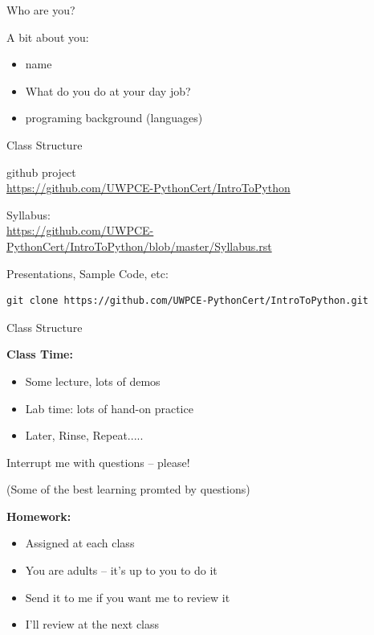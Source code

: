 \documentclass{beamer}
\begin{document}
\begin{frame}{Who are you?}

{\Large A bit about you:}
\begin{itemize}
  \item name
  \item What do you do at your day job?
  \item programing background (languages)
\end{itemize}

\end{frame}


\begin{frame}[fragile]{Class Structure}

{\LARGE github project} \\
\url{https://github.com/UWPCE-PythonCert/IntroToPython}

\vspace{0.2in}
{\large Syllabus:} \\
\url{https://github.com/UWPCE-PythonCert/IntroToPython/blob/master/Syllabus.rst} 

\vspace{0.2in}
{\large Presentations, Sample Code, etc:}

{\small
\begin{verbatim}
git clone https://github.com/UWPCE-PythonCert/IntroToPython.git
\end{verbatim}
}
\end{frame}

\begin{frame}{Class Structure}

{\large \bf Class Time:}
  \begin{itemize}
     \item Some lecture, lots of demos
     \item Lab time: lots of hand-on practice
     \item Later, Rinse, Repeat.....
  \end{itemize}

Interrupt me with questions -- please!

(Some of the best learning promted by questions)

\vfill
{\large \bf Homework:}
  \begin{itemize}
     \item Assigned at each class
     \item You are adults -- it's up to you to do it
     \item Send it to me if you want me to review it
     \item I'll review at the next class
  \end{itemize}

\end{frame}
\end{document}
